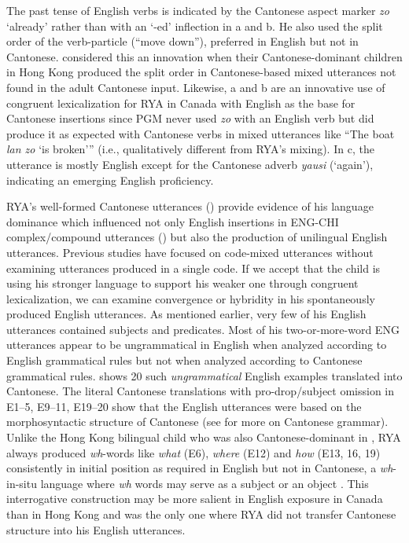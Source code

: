 \documentclass[output=paper,colorlinks,citecolor=brown]{langscibook}
\begin{document}
The past tense of English verbs is indicated by the Cantonese aspect marker \textit{zo} ‘already’ rather than with an ‘-ed’ inflection in a and b. He also used the split order of the verb-particle (“move down”), preferred in English but not in Cantonese. \citet[12]{YipMatthews2016} considered this an innovation when their Cantonese-dominant children in Hong Kong produced the split order in Cantonese-based mixed utterances not found in the adult Cantonese input. Likewise, a and b are an innovative use of congruent lexicalization for RYA in Canada with English as the base for Cantonese insertions since PGM never used \textit{zo} with an English verb but did produce it as expected with Cantonese verbs in mixed utterances like “The boat \textit{lan zo} ‘is broken’” (i.e., qualitatively different from RYA’s mixing). In c, the utterance is mostly English except for the Cantonese adverb \textit{yausi} (‘again’), indicating an emerging English proficiency.

RYA’s well-formed Cantonese utterances () provide evidence of his language dominance which influenced not only English insertions in ENG-CHI complex/compound utterances () but also the production of unilingual English utterances. Previous studies have focused on code-mixed utterances without examining utterances produced in a single code. If we accept that the child is using his stronger language to support his weaker one through congruent lexicalization, we can examine convergence or hybridity in his spontaneously produced English utterances. As mentioned earlier, very few of his English utterances contained subjects and predicates. Most of his two-or-more-word ENG utterances appear to be ungrammatical in English when analyzed according to English grammatical rules but not when analyzed according to Cantonese grammatical rules.  shows 20 such \textit{ungrammatical} English examples translated into Cantonese. The literal Cantonese translations with pro-drop/subject omission in E1–5, E9–11, E19–20 show that the English utterances were based on the morphosyntactic structure of Cantonese (see \citealt{Wong2023} for more on Cantonese grammar). Unlike the Hong Kong bilingual child who was also Cantonese-dominant in \citet{YipMatthews2000}, RYA always produced \textit{wh}{}-words like \textit{what} (E6), \textit{where} (E12) and \textit{how} (E13, 16, 19) consistently in initial position as required in English but not in Cantonese, a \textit{wh}{}-in-situ language where \textit{wh} words may serve as a subject or an object \citep{Wong2023}. This interrogative construction may be more salient in English exposure in Canada than in Hong Kong and was the only one where RYA did not transfer Cantonese structure into his English utterances.
\end{document}
